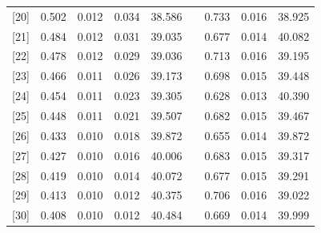 \documentclass[11pt]{beamer}
\begin{document}
\begin{frame}
{\begin{table}
\begin{tabular}{l|llll|l|lll}
{[}20{]} & 0.502  & 0.012 & 0.034 & 38.586 &  & 0.733  & 0.016 & 38.925 \\
{[}21{]} & 0.484  & 0.012 & 0.031 & 39.035 &  & 0.677  & 0.014 & 40.082 \\
{[}22{]} & 0.478  & 0.012 & 0.029 & 39.036 &  & 0.713  & 0.016 & 39.195 \\
{[}23{]} & 0.466  & 0.011 & 0.026 & 39.173 &  & 0.698  & 0.015 & 39.448 \\
{[}24{]} & 0.454  & 0.011 & 0.023 & 39.305 &  & 0.628  & 0.013 & 40.390 \\
{[}25{]} & 0.448  & 0.011 & 0.021 & 39.507 &  & 0.682  & 0.015 & 39.467 \\
{[}26{]} & 0.433  & 0.010 & 0.018 & 39.872 &  & 0.655  & 0.014 & 39.872 \\
{[}27{]} & 0.427  & 0.010 & 0.016 & 40.006 &  & 0.683  & 0.015 & 39.317 \\
{[}28{]} & 0.419  & 0.010 & 0.014 & 40.072 &  & 0.677  & 0.015 & 39.291 \\
{[}29{]} & 0.413  & 0.010 & 0.012 & 40.375 &  & 0.706  & 0.016 & 39.022 \\
{[}30{]} & 0.408  & 0.010 & 0.012 & 40.484 &  & 0.669  & 0.014 & 39.999
\end{tabular}
\end{table}
}
\end{frame}
\end{document}
